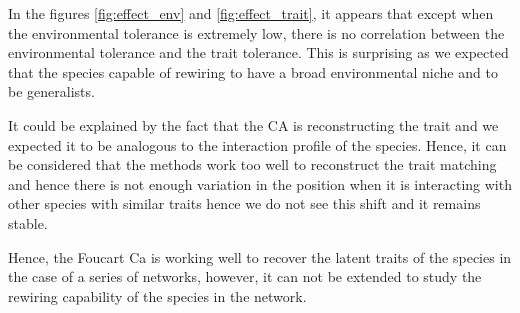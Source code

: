 In the figures \ref{fig:effect_env} and \ref{fig:effect_trait}, it appears that except when the environmental tolerance is extremely low, there is no correlation between the environmental tolerance and the trait tolerance. This is surprising as we expected that the species capable of rewiring to have a broad environmental niche and to be generalists.

It could be explained by the fact that the CA is reconstructing the trait and we expected it to be analogous to the interaction profile of the species. Hence, it can be considered that the methods work too well to reconstruct the trait matching and hence there is not enough variation in the position when it is interacting with other species with similar traits hence we do not see this shift and it remains stable.

Hence, the Foucart Ca is working well to recover the latent traits of the species in the case of a series of networks, however, it can not be extended to study the rewiring capability of the species in the network. 


